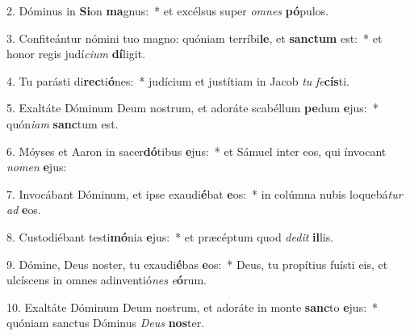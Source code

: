 2. Dóminus in \textbf{Si}on \textbf{ma}gnus:~*  et excélsus super \textit{om}\textit{nes} \textbf{pó}pulos.\

3. Confiteántur nómini tuo magno: quóniam terríbi\textbf{le}, et \textbf{sanc}\textbf{tum} est:~*  et honor regis judí\textit{ci}\textit{um} \textbf{dí}ligit.\

4. Tu parásti di\textbf{rec}ti\textbf{ó}nes:~*  judícium et justítiam in Jacob \textit{tu} \textit{fe}\textbf{cís}ti.\

5. Exaltáte Dóminum Deum nostrum, et adoráte scabéllum \textbf{pe}dum \textbf{e}jus:~*  quón\textit{i}\textit{am} \textbf{sanc}tum est.\

6. Móyses et Aaron in sacer\textbf{dó}tibus \textbf{e}jus:~*  et Sámuel inter eos, qui ínvocant \textit{no}\textit{men} \textbf{e}jus:\

7. Invocábant Dóminum, et ipse exaudi\textbf{é}bat \textbf{e}os:~*  in colúmna nubis loquebá\textit{tur} \textit{ad} \textbf{e}os.\

8. Custodiébant testi\textbf{mó}nia \textbf{e}jus:~*  et præcéptum quod \textit{de}\textit{dit} \textbf{il}lis.\

9. Dómine, Deus noster, tu exaudi\textbf{é}bas \textbf{e}os:~*  Deus, tu propítius fuísti eis, et ulcíscens in omnes adinventió\textit{nes} \textit{e}\textbf{ó}rum.\

10. Exaltáte Dóminum Deum nostrum, et adoráte in monte \textbf{sanc}to \textbf{e}jus:~*  quóniam sanctus Dóminus \textit{De}\textit{us} \textbf{nos}ter.\

